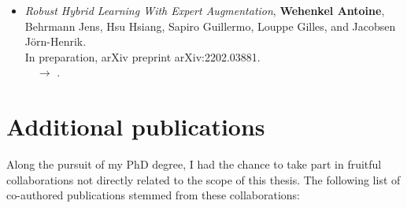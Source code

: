 \begin{tcolorbox}
\begin{itemize}
  \item[] \citep{wehenkel2022robust} \textit{Robust Hybrid Learning With Expert Augmentation},
  \textbf{Wehenkel Antoine}, Behrmann Jens, Hsu Hsiang, Sapiro Guillermo, Louppe Gilles, and Jacobsen J{\"o}rn-Henrik.\\
  In preparation, arXiv preprint arXiv:2202.03881.\\
  $\quad \rightarrow$ .

  \end{itemize}
\end{tcolorbox}

\section{Additional publications}

Along the pursuit of my PhD degree, I had the chance to take part in fruitful collaborations not directly related to the scope of this thesis.
The following list of co-authored publications stemmed from these collaborations:

